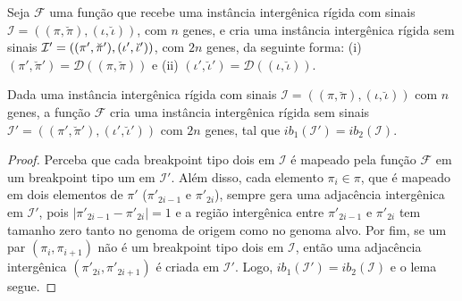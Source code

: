 

Seja $\mathcal{F}$ uma função que recebe uma instância intergênica rígida com sinais $\mathcal{I}=((\pi,\breve\pi),(\iota,\breve\iota))$, com $n$ genes, e cria uma instância intergênica rígida sem sinais $\mathcal{I'}=((\pi',\breve\pi'),\break(\iota',\breve\iota'))$, com $2n$ genes, da seguinte forma: (i) $(\pi',\breve\pi') = \mathcal{D}((\pi,\breve\pi))$ e (ii) $(\iota',\breve\iota') = \mathcal{D}((\iota,\breve\iota))$.

\begin{lemma}\label{lemma:FKOCCOYY}
Dada uma instância intergênica rígida com sinais $\mathcal{I} = ((\pi,\breve\pi),(\iota,\breve\iota))$ com $n$ genes, a função $\mathcal{F}$ cria uma instância intergênica rígida sem sinais $\mathcal{I'} = ((\pi',\breve\pi'),(\iota',\breve\iota'))$ com $2n$ genes, tal que $ib_1(\mathcal{I'}) = ib_2(\mathcal{I})$.
\end{lemma}
\begin{proof}
Perceba que cada breakpoint tipo dois em $\mathcal{I}$ é mapeado pela função $\mathcal{F}$ em um breakpoint tipo um em $\mathcal{I'}$. Além disso, cada elemento $\pi_i \in \pi$, que é mapeado em dois elementos de $\pi'$ ($\pi'_{2i-1}$ e $\pi'_{2i}$), sempre gera uma adjacência intergênica em $\mathcal{I'}$, pois $|\pi'_{2i-1} - \pi'_{2i}| = 1$ e a região intergênica entre $\pi'_{2i-1}$ e $\pi'_{2i}$ tem tamanho zero tanto no genoma de origem como no genoma alvo. Por fim, se um par $(\pi_{i},\pi_{i+1})$ não é um breakpoint tipo dois em $\mathcal{I}$, então uma adjacência intergênica $(\pi'_{2i},\pi'_{2i+1})$ é criada em $\mathcal{I'}$. Logo, $ib_1(\mathcal{I'}) = ib_2(\mathcal{I})$ e o lema segue.
\end{proof}

